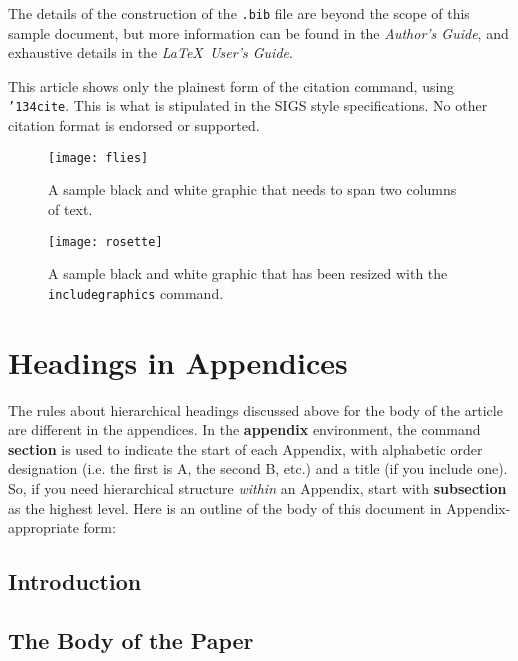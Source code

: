 \documentclass{sig-alternate-05-2015}
\begin{document}
The details of the construction of the \texttt{.bib} file
are beyond the scope of this sample document, but more
information can be found in the \textit{Author's Guide},
and exhaustive details in the \textit{\LaTeX\ User's
Guide}\cite{Lamport:LaTeX}.

This article shows only the plainest form
of the citation command, using \texttt{{\char'134}cite}.
This is what is stipulated in the SIGS style specifications.
No other citation format is endorsed or supported.



\begin{figure*}
\centering
\texttt{[image: flies]}
\caption{A sample black and white graphic
that needs to span two columns of text.}
\end{figure*}


\begin{figure}
\centering
\texttt{[image: rosette]}
\caption{A sample black and white graphic that has
been resized with the \texttt{includegraphics} command.}
\vskip -6pt
\end{figure}


%

%
%
\appendix
\section{Headings in Appendices}
The rules about hierarchical headings discussed above for
the body of the article are different in the appendices.
In the \textbf{appendix} environment, the command
\textbf{section} is used to
indicate the start of each Appendix, with alphabetic order
designation (i.e. the first is A, the second B, etc.) and
a title (if you include one).  So, if you need
hierarchical structure
\textit{within} an Appendix, start with \textbf{subsection} as the
highest level. Here is an outline of the body of this
document in Appendix-appropriate form:
\subsection{Introduction}
\subsection{The Body of the Paper}
\end{document}
